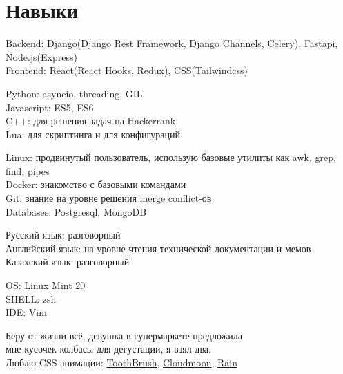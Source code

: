 \documentclass[10pt]{article} %
\begin{document}
\section{Навыки}

{
  Backend: Django(Django Rest Framework, Django Channels, Celery), Fastapi, Node.js(Express)\\
  Frontend: React(React Hooks, Redux), CSS(Tailwindcss)
}

{
  Python: asyncio, threading, GIL\\
  Javascript: ES5, ES6\\
  C++: для решения задач на Hackerrank\\
  Lua: для скриптинга и для конфигураций
}

{
  Linux: продвинутый пользователь, использую базовые утилиты как awk, grep, find, pipes\\
  Docker: знакомство с базовыми командами\\
  Git: знание на уровне решения merge conflict-ов\\
  Databases: Postgresql, MongoDB
}

{
  Русский язык: разговорный\\
  Английский язык: на уровне чтения технической документации и мемов\\
  Казахский язык: разговорный
}


{
  OS: Linux Mint 20\\
  SHELL: zsh\\
  IDE: Vim
}

{
  Беру от жизни всё, девушка в супермаркете предложила \\ 
  мне кусочек колбасы для дегустации, я взял два. \\ 
  Люблю CSS анимации: \href{https://kuator.github.io/gh-pages/image-reveal-kinda}{ToothBrush},
    \href{https://kuator.github.io/gh-pages/cloudmoon}{Cloudmoon},
    \href{https://kuator.github.io/gh-pages/rain/}{Rain}
}
\end{document}
